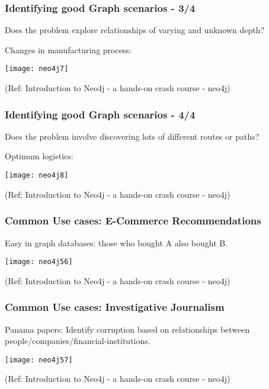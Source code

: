 \begin{frame}\frametitle{Identifying good Graph scenarios - 3/4}

Does the problem explore relationships of varying and unknown depth?

Changes in manufacturing process:

\begin{center}
\texttt{[image: neo4j7]}
\end{center}	  

{\tiny (Ref: Introduction to Neo4j - a hands-on crash course - neo4j)}
\end{frame}

\begin{frame}\frametitle{Identifying good Graph scenarios - 4/4}

Does the problem involve discovering lots of different routes or paths?

Optimum logistics:

\begin{center}
\texttt{[image: neo4j8]}
\end{center}	  

{\tiny (Ref: Introduction to Neo4j - a hands-on crash course - neo4j)}
\end{frame}

\begin{frame}\frametitle{Common Use cases: E-Commerce Recommendations}


Easy in graph databases: those who bought A also bought B.

\begin{center}
\texttt{[image: neo4j56]}
\end{center}	

{\tiny (Ref: Introduction to Neo4j - a hands-on crash course - neo4j)}
\end{frame}

\begin{frame}\frametitle{Common Use cases: Investigative Journalism}

Panama papers: Identify corruption based on relationships between people/companies/financial-institutions.

\begin{center}
\texttt{[image: neo4j57]}
\end{center}	

{\tiny (Ref: Introduction to Neo4j - a hands-on crash course - neo4j)}
\end{frame}

